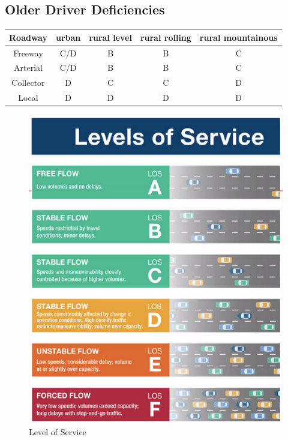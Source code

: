 \documentclass{article}
\begin{document}

  \subsection{Older Driver Deficiencies}


  \begin{tabular}{|c|c|c|c|c|}
    Roadway & urban & rural level & rural rolling & rural mountainous\\
    \hline
    Freeway & C/D   & B & B & C\\
    Arterial & C/D  & B & B & C\\
    Collector & D   & C & C & D\\
    Local & D       & D & D & D\\
  \end{tabular}
  \begin{figure}[h!]
    \includegraphics[width=\linewidth]{LOS.png}
    \caption{Level of Service}
    \label{fig:image-LOS}
  \end{figure}
\end{document}
